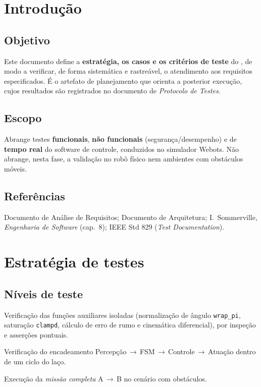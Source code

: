 
\newcommand{\tipodoc}{Plano de Testes}
\newcommand{\datadoc}{30 de junho de 2026}


\fazcapa
\controleversoes
\tableofcontents
\newpage

\section{Introdução}
\subsection{Objetivo}
Este documento define a \textbf{estratégia, os casos e os critérios de teste} do \emph{\projnome}, de modo a verificar, de forma sistemática e rastreável, o atendimento aos requisitos especificados. É o artefato de planejamento que orienta a posterior execução, cujos resultados são registrados no documento de \emph{Protocolo de Testes}.

\subsection{Escopo}
Abrange testes \textbf{funcionais}, \textbf{não funcionais} (segurança/desempenho) e de \textbf{tempo real} do software de controle, conduzidos no simulador Webots. Não abrange, nesta fase, a validação no robô físico nem ambientes com obstáculos móveis.

\subsection{Referências}
Documento de Análise de Requisitos; Documento de Arquitetura; I.~Sommerville, \emph{Engenharia de Software} (cap.~8); IEEE Std 829 (\emph{Test Documentation}).

\section{Estratégia de testes}
\subsection{Níveis de teste}
\begin{description}[leftmargin=2.2cm,style=nextline]
  \item[Unidade] Verificação das funções auxiliares isoladas (normalização de ângulo \texttt{wrap\_pi}, saturação \texttt{clampd}, cálculo de erro de rumo e cinemática diferencial), por inspeção e asserções pontuais.
  \item[Integração] Verificação do encadeamento Percepção\,$\to$\,FSM\,$\to$\,Controle\,$\to$\,Atuação dentro de um ciclo do laço.
  \item[Sistema] Execução da \emph{missão completa} A\,$\to$\,B no cenário com obstáculos.
\end{description}

